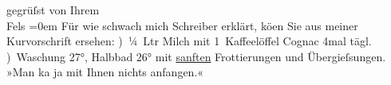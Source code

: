 \begin{ledgroupsized}[t]{13cm}
                    gegrüſst von\pend
           \pstart
           Ihrem{\\[\baselineskip]}\spacefill\mbox{Fels}\pend
           \leftskip=0em{}\pstart
           \noindent{}Für wie schwach mich Schreiber erklärt,
                            kö{\geminationn}en Sie aus meiner Kurvorschrift
                        ersehen:\pend
           ) ¼ Ltr Milch mit 1 Kaffeelöffel Cognac 4mal tägl.\pend
           ) Waschung 27°, Halbbad 26° mit \uline{sanften}
                        Frottierungen und Übergieſsungen. »Man ka{\geminationn} ja
                        mit Ihnen nichts anfangen.«\pend
           \endnumbering{}\end{ledgroupsized}  \newcommand{\dateiname}{L00176}\newcommand{\titel}{Friedrich M. Fels an Arthur Schnitzler, 1[6]. 2. 1893}\newcommand{\editorInnen}{Martin Anton Müller und Gerd-Hermann Susen}
      